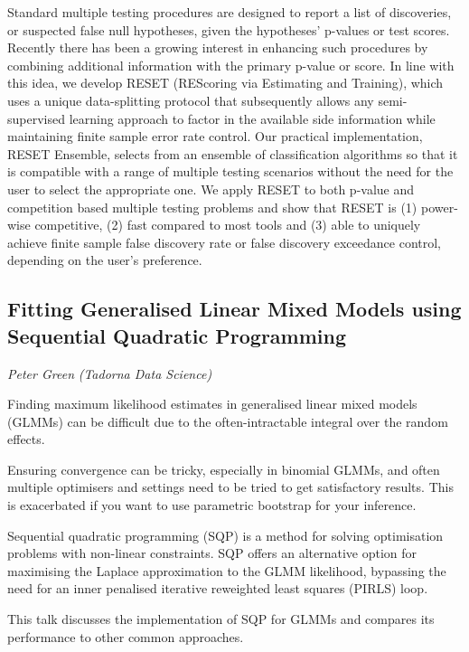 \documentclass[
]{scrreprt}
\begin{document}
Standard multiple testing procedures are designed to report a list of
discoveries, or suspected false null hypotheses, given the hypotheses'
p-values or test scores. Recently there has been a growing interest in
enhancing such procedures by combining additional information with the
primary p-value or score. In line with this idea, we develop RESET
(REScoring via Estimating and Training), which uses a unique
data-splitting protocol that subsequently allows any semi-supervised
learning approach to factor in the available side information while
maintaining finite sample error rate control. Our practical
implementation, RESET Ensemble, selects from an ensemble of
classification algorithms so that it is compatible with a range of
multiple testing scenarios without the need for the user to select the
appropriate one. We apply RESET to both p-value and competition based
multiple testing problems and show that RESET is (1) power-wise
competitive, (2) fast compared to most tools and (3) able to uniquely
achieve finite sample false discovery rate or false discovery exceedance
control, depending on the user's preference.

\subsection{Fitting Generalised Linear Mixed Models using Sequential
Quadratic
Programming}\label{fitting-generalised-linear-mixed-models-using-sequential-quadratic-programming}

\emph{Peter Green} \emph{(Tadorna Data Science)}

\setlength{\parskip}{0.5em}

Finding maximum likelihood estimates in generalised linear mixed models
(GLMMs) can be difficult due to the often-intractable integral over the
random effects.

Ensuring convergence can be tricky, especially in binomial GLMMs, and
often multiple optimisers and settings need to be tried to get
satisfactory results. This is exacerbated if you want to use parametric
bootstrap for your inference.

Sequential quadratic programming (SQP) is a method for solving
optimisation problems with non-linear constraints. SQP offers an
alternative option for maximising the Laplace approximation to the GLMM
likelihood, bypassing the need for an inner penalised iterative
reweighted least squares (PIRLS) loop.

This talk discusses the implementation of SQP for GLMMs and compares its
performance to other common approaches.
\end{document}
